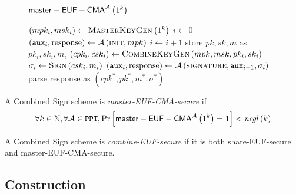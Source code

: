     \begin{figure}[!htbp]
      \begin{gamebox}{$\mathsf{master-EUF-CMA}^{\mathcal{A}}\left(1^k\right)$}
        \begin{algorithmic}[1]
          \State $\left(mpk_i, msk_i\right) \gets
          \textsc{MasterKeyGen}\left(1^k\right)$
          \State $i \gets 0$
          \State $\left(\mathtt{aux}_i, \mathrm{response}\right) \gets
          \mathcal{A}\left(\textsc{init}, mpk\right)$
            \State $i \gets i + 1$
            \State store $pk, sk, m$ as $pk_i, sk_i, m_i$
            \State $\left(cpk_i, csk_i\right) \gets
            \textsc{CombineKeyGen}\left(mpk, msk, pk_i, sk_i\right)$
            \State $\sigma_i \gets \textsc{Sign}\left(csk_i, m_i\right)$
            \State $\left(\mathtt{aux}_i, \mathrm{response}\right) \gets
            \mathcal{A}\left(\textsc{signature}, \mathtt{aux}_{i-1},
            \sigma_i\right)$
          \EndWhile
          \State parse response as $\left(cpk^*, pk^*, m^*, \sigma^*\right)$
            \State {}
          \Else
            \State {}
          \EndIf
        \end{algorithmic}
      \end{gamebox}
      \caption{}
      \label{game:comb:master}
    \end{figure}
    \begin{definition}
      A Combined Sign scheme is \emph{\textsf{master-EUF-CMA}-secure} if
      \begin{equation*}
        \forall k \in \mathbb{N}, \forall \mathcal{A} \in \mathtt{PPT},
        \Pr\left[\mathsf{master-EUF-CMA}^{\mathcal{A}}\left(1^k\right) = 1\right]
        < \mathit{negl}\left(k\right)
      \end{equation*}
    \end{definition}
    \begin{definition}
      A Combined Sign scheme is \emph{\textsf{combine-EUF}-secure} if it is both
      \textsf{share-EUF}-secure and \textsf{master-EUF-CMA}-secure.
    \end{definition}

  \subsection{Construction}

